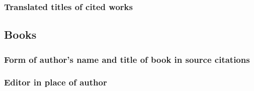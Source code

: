 \documentclass[11pt,letterpaper,oneside]{article}
\begin{document}
\setcounter{subsubsection}{98}
\subsubsection{Translated titles of cited works}

\begin{citebib}
\item \cite[272]{kern1938}
\item \cite{pirumova1977b}
\item \cite{furet1999}
\end{citebib}

\setcounter{subsection}{4}
\subsection{Books}
\setcounter{subsection}{14}

\setcounter{subsubsection}{100}
\subsubsection{Form of author's name and title of book in source citations}

\begin{citebib}
\item \cite[79--80]{gawande2014}
\item \cite[191]{gawande2014}
\end{citebib}

\setcounter{subsubsection}{102}
\subsubsection{Editor in place of author}
\label{14.103}

\begin{citebib}
\item \cite[100]{egan2014}
\item \cite[33]{schechter2011}
\item \cite[34]{silverstein1974}
\item \cite[301--2]{egan2014}
\item \cite[54--56]{schechter2011}
\item \cite[38]{silverstein1974}
\end{citebib}
\end{document}
